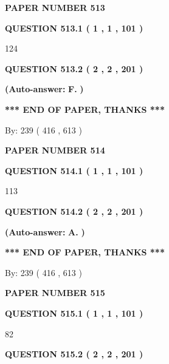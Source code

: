 \documentclass[12pt]{article}
\begin{document}
   
\newpage 
\setcounter{page}{ 
   513001 } 
   
   
 {\textbf{ \Large{ PAPER NUMBER  513  }}}
   
   
   
   
  
  
{\textbf{\large{QUESTION
513.1 
 ( 1 , 1 , 101 )
}}}

124
  
  
{\textbf{\large{QUESTION
513.2 
 ( 2 , 2 , 201 )
}}}
 
 
{\textbf{(Auto-answer:}}
{\textbf{\large{
F.}}}
{\textbf{)}}
 
 
   
   
   
   
\vspace{1.0in} 
{\textbf{\large{ *** END OF PAPER, THANKS *** }}} 
   
   
\hspace{1.0in} By: 
 239 ( 416 ,  613 )
   
   
   
   
\newpage 
\setcounter{page}{ 
   514001 } 
   
   
 {\textbf{ \Large{ PAPER NUMBER  514  }}}
   
   
   
   
  
  
{\textbf{\large{QUESTION
514.1 
 ( 1 , 1 , 101 )
}}}

113
  
  
{\textbf{\large{QUESTION
514.2 
 ( 2 , 2 , 201 )
}}}
 
 
{\textbf{(Auto-answer:}}
{\textbf{\large{
A.}}}
{\textbf{)}}
 
 
   
   
   
   
\vspace{1.0in} 
{\textbf{\large{ *** END OF PAPER, THANKS *** }}} 
   
   
\hspace{1.0in} By: 
 239 ( 416 ,  613 )
   
   
   
   
\newpage 
\setcounter{page}{ 
   515001 } 
   
   
 {\textbf{ \Large{ PAPER NUMBER  515  }}}
   
   
   
   
  
  
{\textbf{\large{QUESTION
515.1 
 ( 1 , 1 , 101 )
}}}

82
  
  
{\textbf{\large{QUESTION
515.2 
 ( 2 , 2 , 201 )
}}}
 
\end{document}
